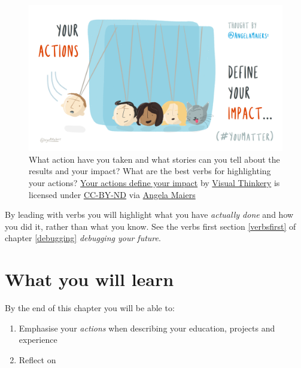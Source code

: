 \documentclass[
]{book}
\providecommand{\tightlist}{%
  \setlength{\itemsep}{0pt}\setlength{\parskip}{0pt}}
\begin{document}
\begin{figure}

{\centering \includegraphics[width=1\linewidth]{images/your-actions} 

}

\caption{What action have you taken and what stories can you tell about the results and your impact? What are the best verbs for highlighting your actions? \href{https://bryanmmathers.com/your-actions-define-your-impact/}{Your actions define your impact} by \href{https://visualthinkery.com/}{Visual Thinkery} is licensed under \href{https://creativecommons.org/licenses/by-nd/4.0/}{CC-BY-ND} via \href{https://twitter.com/AngelaMaiers}{Angela Maiers}}\label{fig:action-fig}
\end{figure}



By leading with verbs you will highlight what you have \emph{actually done} and how you did it, rather than what you know. See the verbs first section \ref{verbsfirst} of chapter \ref{debugging} \emph{debugging your future}.

\hypertarget{ilo17}{%
\section{What you will learn}\label{ilo17}}

By the end of this chapter you will be able to:

\begin{enumerate}
\def\labelenumi{\arabic{enumi}.}
\tightlist
\item
  Emphasise your \emph{actions} when describing your education, projects and experience
\item
  Reflect on
\end{enumerate}
\end{document}
